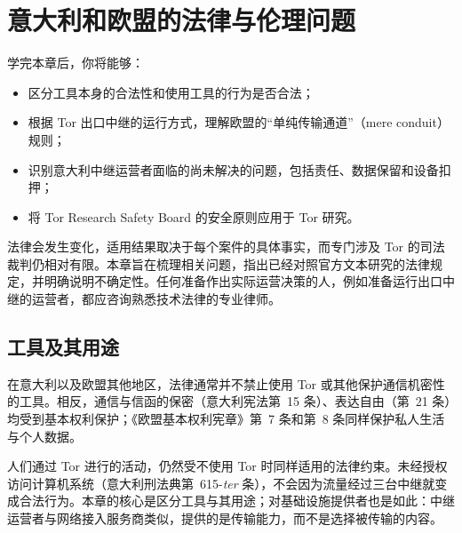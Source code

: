 \chapter{意大利和欧盟的法律与伦理问题}\label{cap:25-legale}

\begin{obiettivi}
学完本章后，你将能够：
\begin{itemize}[nosep]
  \item 区分工具本身的合法性和使用工具的行为是否合法；
  \item 根据 Tor 出口中继的运行方式，理解欧盟的\enquote{单纯传输通道}（mere conduit）规则；
  \item 识别意大利中继运营者面临的尚未解决的问题，包括责任、数据保留和设备扣押；
  \item 将 Tor Research Safety Board 的安全原则应用于 Tor 研究。
\end{itemize}
\end{obiettivi}

\begin{attenzione}[本章不构成法律意见]
法律会发生变化，适用结果取决于每个案件的具体事实，而专门涉及 Tor 的司法裁判仍相对有限。本章旨在梳理相关问题，指出已经对照官方文本研究的法律规定，并明确说明不确定性。任何准备作出实际运营决策的人，例如准备运行出口中继的运营者，都应咨询熟悉技术法律的专业律师。
\end{attenzione}

\section{工具及其用途}\label{sec:legale-strumento}

在意大利以及欧盟其他地区，法律通常并不禁止使用 Tor 或其他保护通信机密性的工具。相反，通信与信函的保密（意大利宪法第~15 条）、表达自由（第~21 条）均受到基本权利保护；《欧盟基本权利宪章》第~7 条和第~8 条同样保护私人生活与个人数据。

人们通过 Tor 进行的活动，仍然受不使用 Tor 时同样适用的法律约束。未经授权访问计算机系统（意大利刑法典第~615-\emph{ter} 条），不会因为流量经过三台中继就变成合法行为。本章的核心是区分工具与其用途；对基础设施提供者也是如此：中继运营者与网络接入服务商类似，提供的是传输能力，而不是选择被传输的内容。

